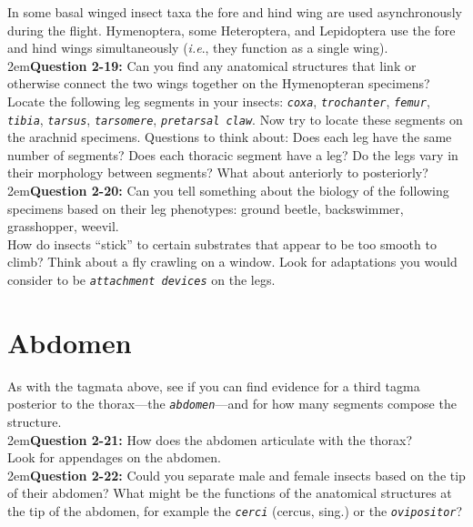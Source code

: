 \documentclass[letterpaper, 11pt]{article}
\newcommand{\latinword}[1]{\texttt{\itshape #1}}%
\begin{document}
\noindent{}In some basal winged insect taxa the fore and hind wing are used asynchronously during the flight. Hymenoptera, some Heteroptera, and Lepidoptera use the fore and hind wings simultaneously (\textit{i.e}., they function as a single wing). \\ 

\hangindent2em\textbf{Question 2-19:} Can you find any anatomical structures that link or otherwise connect the two wings together on the Hymenopteran specimens?\\

\noindent{}Locate the following leg segments in your insects: \latinword{coxa}, \latinword{trochanter}, \latinword{femur}, \latinword{tibia}, \latinword{tarsus}, \latinword{tarsomere}, \latinword{pretarsal claw}. Now try to locate these segments on the arachnid specimens. Questions to think about: Does each leg have the same number of segments? Does each thoracic segment have a leg? Do the legs vary in their morphology between segments? What about anteriorly to posteriorly?\\


\hangindent2em\textbf{Question 2-20:} Can you tell something about the biology of the following specimens based on their leg phenotypes: ground beetle, backswimmer, grasshopper, weevil.\\

\noindent{}How do insects ``stick'' to certain substrates that appear to be too smooth to climb? Think about a fly crawling on a window. Look for adaptations you would consider to be \latinword{attachment devices} on the legs.

\section{Abdomen}
As with the tagmata above, see if you can find evidence for a third tagma posterior to the thorax---the \latinword{abdomen}---and for how many segments compose the structure.\\

\hangindent2em\textbf{Question 2-21:} How does the abdomen articulate with the thorax?\\

\noindent{}Look for appendages on the abdomen. \\

\hangindent2em\textbf{Question 2-22:} Could you separate male and female insects based on the tip of their abdomen? What might be the functions of the anatomical structures at the tip of the abdomen, for example the \latinword{cerci} (cercus, sing.) or the \latinword{ovipositor}? \\
\end{document}
